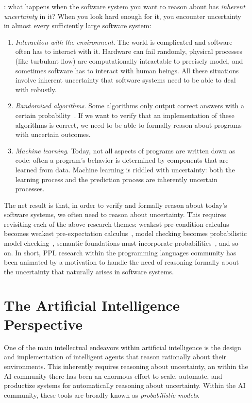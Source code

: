 \documentclass{../tufte-handout}
\begin{document}
: what happens when the 
software system you want to reason about has \emph{inherent uncertainty} in it?
When you look hard enough for it, you
encounter uncertainty in almost every sufficiently large software system:
\begin{enumerate}
  \item \emph{Interaction with the environment}. The world is complicated and 
  software often has to interact with it.
  Hardware can fail randomly, physical processes (like turbulant flow)
  are computationally intractable to precisely model, and sometimes software has
  to interact with human beings. All these situations involve inherent
  uncertainty that software systems need to be able to deal with robustly.
  \item \emph{Randomized algorithms}. Some algorithms only output correct 
  answers with a certain probability~\citep{motwani1995randomized}. If we want to verify that an
  implementation of these algorithms is correct, we need to be able to 
  formally reason about programs with uncertain outcomes.
  \item \emph{Machine learning}. Today, not all aspects of programs are written down as code: 
  often a program's behavior is determined by components that are learned from data. Machine 
  learning is riddled with uncertainty: both the learning process and the prediction process 
  are inherently uncertain processes. 
\end{enumerate}

The net result is that, in order to verify and formally reason about today's
software systems, we often need to reason about uncertainty. 
This requires revisiting each of the above research themes: weakest pre-condition 
calculus becomes weakest pre-expectation calculus~\citep{mciver2005abstraction},
model checking becomes probabilistic model checking~\citep{katoen2016probabilistic},
semantic foundations must incorporate probabilities~\citep{kozen1979semantics},
and so on.
In short, PPL research within the programming languages community has been
animated by a motivation to handle the need of reasoning formally about the
uncertainty that naturally arises in software systems.

\section{The Artificial Intelligence Perspective}
One of the main intellectual endeavors within artificial intelligence is the 
design and implementation of intelligent agents that reason rationally about their environments.
This inherently requires reasoning about uncertainty, an within the AI 
community there has been an enormous effort to scale, automate, and productize 
systems for automatically reasoning about uncertainty.
Within the AI community, these tools are broadly known as \emph{probabilistic models}.
\end{document}
